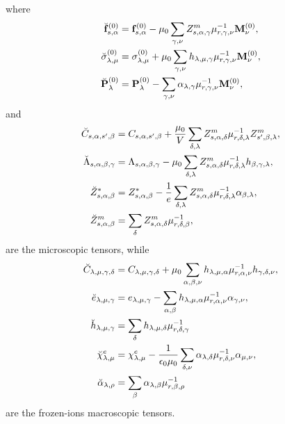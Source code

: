 \documentclass[12pt,a4paper]{article}
\begin{document}
where
\begin{align}
\breve {\bf f}^{(0)}_{s,\alpha}&= {\bf f}^{(0)}_{s,\alpha} - \mu_0 
\sum_{\gamma,\nu}
Z^m_{s,\alpha,\gamma} \mu^{-1}_{r,\gamma,\nu} {\bf M}^{(0)}_\nu, \\
\breve \sigma^{(0)}_{\lambda,\mu}&= \sigma^{(0)}_{\lambda,\mu}
+\mu_0 \sum_{\gamma,\nu} h_{\lambda,\mu,\gamma} \mu^{-1}_{r,\gamma,\nu} 
{\bf M}^{(0)}_\nu, \\
\breve {\bf P}^{(0)}_\lambda&= {\bf P}^{(0)}_\lambda -
\sum_{\gamma,\nu} \alpha_{\lambda,\gamma} \mu^{-1}_{r,\gamma,\nu} 
{\bf M}^{(0)}_\nu, \\
\end{align}
and
\begin{align}
\breve C_{s,\alpha,s',\beta} &= C_{s,\alpha,s',\beta}+
{\mu_0\over V}  \sum_{\delta,\lambda} Z^m_{s,\alpha,\delta}
\mu^{-1}_{r,\delta,\lambda}Z^m_{s',\beta,\lambda},\\
\breve \Lambda_{s,\alpha,\beta,\gamma} &= \Lambda_{s,\alpha,\beta,\gamma}
- \mu_0 \sum_{\delta,\lambda} Z^m_{s,\alpha,\delta}
\mu^{-1}_{r,\delta,\lambda} h_{\beta,\gamma,\lambda}, \\
\breve Z^*_{s,\alpha,\beta} &= Z^*_{s,\alpha,\beta}
-{1\over e} \sum_{\delta,\lambda} Z^m_{s,\alpha,\delta} 
\mu^{-1}_{r,\delta,\lambda} \alpha_{\beta,\lambda}, \\
\breve Z^m_{s,\alpha,\beta} &= \sum_{\delta} Z^m_{s,\alpha,\delta} 
\mu^{-1}_{r,\delta,\beta}, 
\end{align}
are the microscopic tensors, while
\begin{align}
\breve C_{\lambda,\mu,\gamma,\delta} &=
C_{\lambda,\mu,\gamma,\delta} + \mu_0 \sum_{\alpha,\beta,\nu}
h_{\lambda,\mu,\alpha} \mu^{-1}_{r,\alpha,\nu} 
h_{\gamma,\delta,\nu}, \\
\breve e_{\lambda,\mu,\gamma}&= e_{\lambda,\mu,\gamma}
-\sum_{\alpha,\beta} h_{\lambda,\mu,\alpha} \mu^{-1}_{r,\alpha,\nu}
\alpha_{\gamma,\nu}, \\
\breve h_{\lambda,\mu,\gamma}&= \sum_\delta h_{\lambda,\mu,\delta}
\mu^{-1}_{r,\delta,\gamma} \\
\breve \chi^e_{\lambda,\mu}&= \chi^e_{\lambda,\mu}
-{1\over \epsilon_0 \mu_0} \sum_{\delta,\nu} \alpha_{\lambda,\delta} 
\mu^{-1}_{r,\delta,\nu} \alpha_{\mu,\nu}, \\
\breve \alpha_{\lambda,\rho} &= \sum_\beta \alpha_{\lambda,\beta}
\mu^{-1}_{r,\beta,\rho}
\end{align}
are the frozen-ions macroscopic tensors.
\\
\newpage
\end{document}
